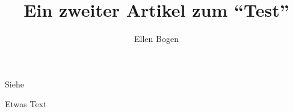 \documentclass{dtk2}
\author{Ellen Bogen}
\begin{document}
\title{Ein zweiter Artikel zum "`Test"'}

\maketitle

Siehe~\cite{lamport:handbuch}

Etwas Text \clearpage

\printbibliography
\end{document}
